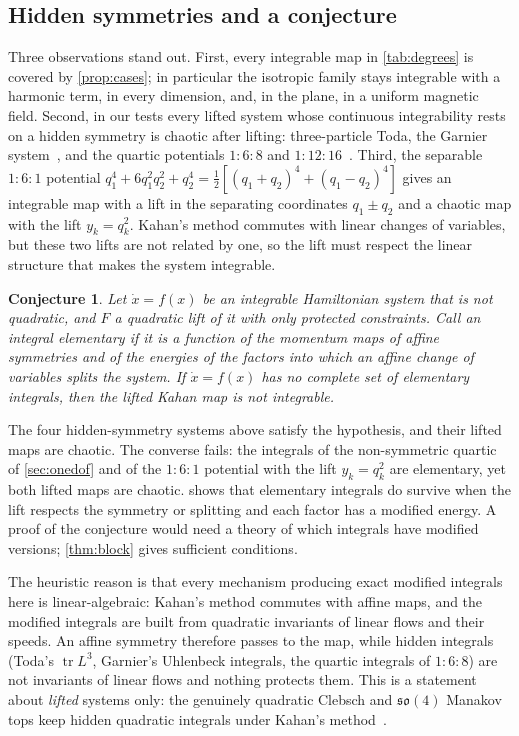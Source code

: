 \documentclass[11pt,a4paper]{article}
\newtheorem{conjecture}[theorem]{Conjecture}
\theoremstyle{definition}
\theoremstyle{remark}
\begin{document}
\subsection{Hidden symmetries and a conjecture}

Three observations stand out. First, every integrable map in \cref{tab:degrees} is covered by
\cref{prop:cases}; in particular the isotropic family stays integrable with a harmonic term, in every
dimension, and, in the plane, in a uniform magnetic field. Second, in our tests every lifted system whose
continuous integrability rests on a hidden symmetry is chaotic after lifting: three-particle Toda, the Garnier
system~\cite{Garnier19}, and the quartic potentials $1{:}6{:}8$ and $1{:}12{:}16$~\cite{Hietarinta87}. Third,
the separable $1{:}6{:}1$ potential $q_1^4+6q_1^2q_2^2+q_2^4=\frac12[(q_1+q_2)^4+(q_1-q_2)^4]$ gives an
integrable map with a lift in the separating coordinates $q_1\pm q_2$ and a chaotic map with the lift
$y_k=q_k^2$. Kahan's method commutes with linear changes of variables, but these two lifts are not related by
one, so the lift must respect the linear structure that makes the system integrable.

\begin{conjecture}\label{conj:principle}
Let $\dot x=f(x)$ be an integrable Hamiltonian system that is not quadratic, and $F$ a quadratic lift of it with
only protected constraints. Call an integral \emph{elementary} if it is a function of the momentum maps of
affine symmetries and of the energies of the factors into which an affine change of variables splits the
system. If $\dot x=f(x)$ has no complete set of elementary integrals, then the lifted Kahan map is not
integrable.
\end{conjecture}

The four hidden-symmetry systems above satisfy the hypothesis, and their lifted maps are chaotic. The converse
fails: the integrals of the non-symmetric quartic of \cref{sec:onedof} and of the $1{:}6{:}1$ potential with the
lift $y_k=q_k^2$ are elementary, yet both lifted maps are chaotic.  shows that elementary
integrals do survive when the lift respects the symmetry or splitting and each factor has a modified energy.
A proof of the conjecture would need a theory of which integrals have modified versions; \cref{thm:block} gives
sufficient conditions.

The heuristic reason is that every mechanism producing exact modified integrals here is linear-algebraic:
Kahan's method commutes with affine maps, and the modified integrals are built from quadratic invariants of
linear flows and their speeds. An affine symmetry therefore passes to the map, while hidden integrals (Toda's
$\operatorname{tr}L^3$, Garnier's Uhlenbeck integrals, the quartic integrals of $1{:}6{:}8$) are not invariants
of linear flows and nothing protects them. This is a statement about \emph{lifted} systems only: the
genuinely quadratic Clebsch and $\mathfrak{so}(4)$ Manakov tops keep hidden quadratic integrals under Kahan's
method~\cite{PPS09,PPS11}.
\end{document}

